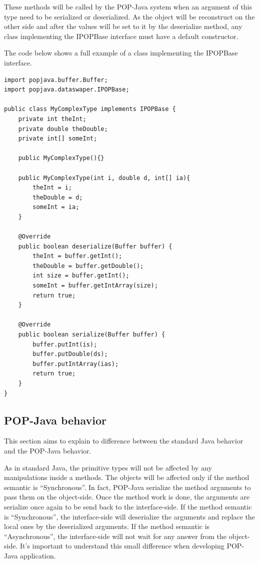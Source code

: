 These methods will be called by the POP-Java system when an argument of this type need to be serialized or deserialized. As the object will be reconstruct on the other side and after the values will be set to it by the deserialize method, any class implementing the IPOPBase interface must have a default constructor.\s

\pagebreak
The code below shows a full example of a class implementing the IPOPBase interface.


\begin{lstlisting}
import popjava.buffer.Buffer;
import popjava.dataswaper.IPOPBase;

public class MyComplexType implements IPOPBase {
	private int theInt;
	private double theDouble;
	private int[] someInt;
	
	public MyComplexType(){}
	
	public MyComplexType(int i, double d, int[] ia){
		theInt = i;
		theDouble = d;
		someInt = ia;
	}
	
	@Override
	public boolean deserialize(Buffer buffer) {
		theInt = buffer.getInt();
		theDouble = buffer.getDouble();
		int size = buffer.getInt();
		someInt = buffer.getIntArray(size);
		return true;
	}

	@Override
	public boolean serialize(Buffer buffer) {
		buffer.putInt(is);
		buffer.putDouble(ds);
		buffer.putIntArray(ias);		
		return true;
	}
}
\end{lstlisting}

\subsection{POP-Java behavior}
This section aims to explain to difference between the standard Java behavior and the POP-Java behavior.\s

As in standard Java, the primitive types will not be affected by any manipulations inside a methods. The objects will be affected only if the method semantic is “Synchronous”. In fact, POP-Java serialize the method arguments to pass them on the object-side. Once the method work is done, the arguments are serialize once again to be send back to the interface-side. If the method semantic is “Synchronous”, the interface-side will deserialize
the arguments and replace the local ones by the deserialized arguments. If the method semantic is
“Asynchronous”, the interface-side will not wait for any answer from the object-side. It's important to understand this small difference when developing POP-Java application.

